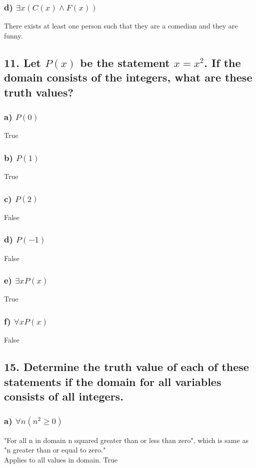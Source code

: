 \documentclass[11pt, oneside]{article} %
\numberwithin{equation}{section} %
\numberwithin{figure}{section} %
\numberwithin{table}{section} %
\begin{document}
\subsubsection{d) $\exists$$x(C(x) \wedge F(x))$}
There exists at least one person such that they are a comedian and they are funny.

\subsection{11. Let $P(x)$ be the statement ${x = x^2}$. If the domain consists of the integers, what are these truth values?}
\subsubsection{a) $P(0)$}
True
\subsubsection{b) $P(1)$}
True
\subsubsection{c) $P(2)$}
False
\subsubsection{d) $P(-1)$}
False
\subsubsection{e) $\exists$$xP(x)$}
True
\subsubsection{f) $\forall$$xP(x)$}
False

\subsection{15. Determine the truth value of each of these statements if the domain for all variables consists of all integers.}
\subsubsection{a) $\forall$$n(n^2 \geq 0)$}
"For all n in domain n squared greater than or less than zero", which is same as "n greater than or equal to zero." \\
Applies to all values in domain. True
\end{document}
